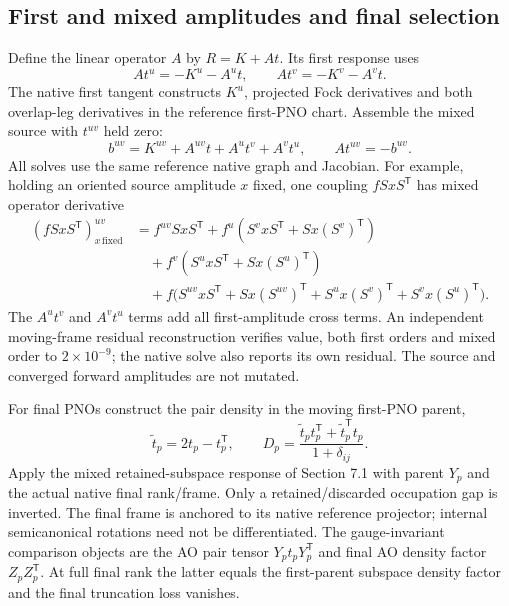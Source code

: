 \documentclass[11pt]{article}
\begin{document}
\subsection{First and mixed amplitudes and final selection}
Define the linear operator $A$ by $R=K+At$. Its first response uses
\begin{equation}
 At^u=-K^u-A^u t,\qquad At^v=-K^v-A^v t.
\end{equation}
The native first tangent constructs $K^u$, projected Fock derivatives and
both overlap-leg derivatives in the reference first-PNO chart. Assemble the
mixed source with $t^{uv}$ held zero:
\begin{equation}
 b^{uv}=K^{uv}+A^{uv}t+A^u t^v+A^v t^u,\qquad
 At^{uv}=-b^{uv}.
 \label{eq:screened-lmp2-mixed}
\end{equation}
All solves use the same reference native graph and Jacobian. For example,
holding an oriented source amplitude $x$ fixed, one coupling $fSxS^{\mathsf T}$
has mixed operator derivative
\begin{align}
 (fSxS^{\mathsf T})^{uv}_{x\,\mathrm{fixed}}
 &=f^{uv}SxS^{\mathsf T}
   +f^u(S^vxS^{\mathsf T}+Sx(S^v)^{\mathsf T})\nonumber\\
 &\quad+f^v(S^uxS^{\mathsf T}+Sx(S^u)^{\mathsf T})\nonumber\\
 &\quad+f\bigl(S^{uv}xS^{\mathsf T}+Sx(S^{uv})^{\mathsf T}
                  +S^ux(S^v)^{\mathsf T}+S^vx(S^u)^{\mathsf T}\bigr).
\end{align}
The $A^ut^v$ and $A^vt^u$ terms add all first-amplitude cross terms. An
independent moving-frame residual reconstruction verifies value, both first
orders and mixed order to $2\times10^{-9}$; the native solve also reports its
own residual. The source and converged forward amplitudes are not mutated.

For final PNOs construct the pair density in the moving first-PNO parent,
\begin{equation}
 \widetilde t_p=2t_p-t_p^{\mathsf T},\qquad
 D_p=\frac{\widetilde t_pt_p^{\mathsf T}+\widetilde t_p^{\mathsf T}t_p}
                  {1+\delta_{ij}} .
\end{equation}
Apply the mixed retained-subspace response of Section 7.1 with parent $Y_p$
and the actual native final rank/frame. Only a retained/discarded occupation
gap is inverted. The final frame is anchored to its native reference
projector; internal semicanonical rotations need not be differentiated.
The gauge-invariant comparison objects are the AO pair tensor
$Y_pt_pY_p^{\mathsf T}$ and final AO density factor
$Z_pZ_p^{\mathsf T}$. At full final rank the latter equals the first-parent
subspace density factor and the final truncation loss vanishes.
\end{document}
